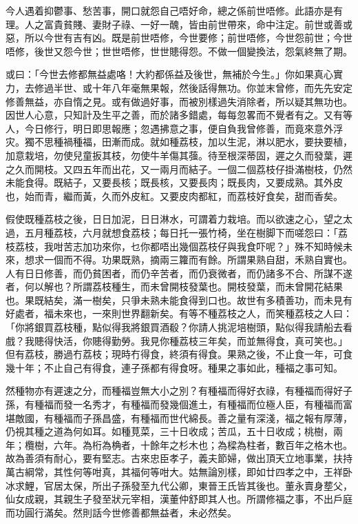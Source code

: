 \documentclass[a5paper, 12pt, openany]{book} %
\begin{document}
	今人遇着抑鬱事、愁苦事，開口就怨自己唔好命，總之係前世唔修。此語亦是有理。人之富貴貧賤、妻財子祿、一好一醜，皆由前世帶來，命中注定。前世或善或惡，所以今世有吉有凶。既是前世唔修，今世要修；前世唔修，今世怨前世；今世唔修，後世又怨今世；世世唔修，世世贃得怨。不做一個變換法，怨氣終無了期。

	或曰：「今世去修都無益處咯！大約都係益及後世，無補於今生。」你如果真心實力，去修過半世、或十年八年毫無果報，然後話得無功。你並末曾修，而先先安定修善無益，亦自惰之見。或有做過好事，而被別樣過失消除者，所以疑其無功也。因世人心意，只知計及生平之善，而於諸多錯處，每每忽畧而不覺者有之。又有等人，今日修行，明日即思報應；忽遇拂意之事，便自負我曾修善，而竟來意外浮灾。獨不思種禍種福，田漸而成。就如種荔枝，加以生泥，淋以肥水，要抉要植，加意栽培，勿使兒童扳其枝，勿使牛羊傷其蔃。待至根深蒂固，遲之久而發葉，遲之久而開枝。又四五年而出花，又一兩月而結子。一個二個荔枝仔掛滿樹枝，仍然未能食得。既結子，又要長核；既長核，又要長肉；既長肉，又要成熟。其外皮也，始而青，繼而黃，久而外皮紅。又要皮肉都紅，而荔枝好食矣，甜而香矣。

	假使既種荔枝之後，日日加泥，日日淋水，可謂着力栽培。而以欲速之心，望之太過，五月種荔枝，六月就想食荔枝；每日托一張竹椅，坐在樹脚下而嗟怨曰：「荔枝荔枝，我咁苦志加功來你，乜你都唔出幾個荔枝仔與我食吓呢？」殊不知時候未來，想求一個而不得。功果既熟，摘兩三籮而有餘。所謂果熟自甜，禾熟自實也。人有日日修善，而仍貧困者，而仍辛苦者，而仍衰微者，而仍諸多不合、所謀不遂者，何以解也？所謂荔枝種生，而未曾開枝發葉也。開枝發葉，而未曾開花結果也。果既結矣，滿一樹矣，只爭未熟未能食得到口也。故世有多積善功，而未見有好處者，福未來也，一來則世界翻新矣。有等不種荔枝之人，而笑種荔枝之人曰：「你將銀買荔枝種，點似得我將銀買酒殽？你請人挑泥培樹頭，點似得我請船去看戲？我贃得快活，你贃得勤勞。我見你種荔枝三年矣，而並無得食，真可笑也。」但有荔枝，勝過冇荔枝；現時冇得食，終須有得食。果熟之後，不止食一年，可食幾十年；不止自己有得食，連子孫都有得食呀。種果之事如此，種福之事可知。

	然種物亦有遲速之分，而種福豈無大小之別？有種福而得好衣祿，有種福而得好子孫，有種福而發一名秀才，有種福而發幾個進土，有種福而位極人臣，有種福而富堪敵國，有種福而子孫昌盛，有種福而世代綿長。善之量有深淺，福之報有厚薄，仍視其種之道為何如耳。如種莧菜，三十日收成；苦瓜，五十日收成；桃樹，兩年；欖樹，六年。為桁為桷者，十餘年之杉木也；為樑為柱者，數百年之格木也。故為善須有耐心，要有堅志。古來忠臣孝子，義夫節婦，做出頂天立地事業，扶持萬古綱常，其性何等咁真，其福何等咁大。姑無論別樣，即如廿四孝之中，王祥卧冰求鯉，官居太保，所出子孫發至九代公卿，東晉王氏皆其後也。董永賣身塟父，仙女成親，其親生子發至狀元宰相，漢董仲舒即其人也。所謂修福之事，不出戶庭而功圓行滿矣。然則話今世修善都無益者，未必然矣。
\end{document}
